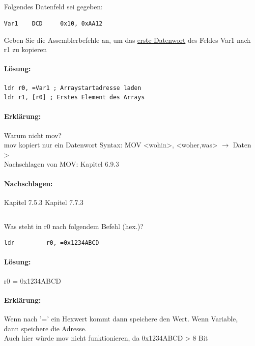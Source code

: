 \documentclass[12pt,twoside,a4paper]{article}
\begin{document}
\subsection{}
Folgendes Datenfeld sei gegeben:
\begin{lstlisting}
Var1 	DCD 	0x10, 0xAA12
\end{lstlisting}
Geben Sie die Assemblerbefehle an, um das \underline{erste Datenwort} des Feldes Var1 nach r1 zu kopieren

\paragraph*{Lösung:}
\begin{lstlisting}
ldr r0, =Var1 ; Arraystartadresse laden 
ldr r1, [r0] ; Erstes Element des Arrays
\end{lstlisting}
\paragraph*{Erklärung:}
Warum nicht mov?\\
mov kopiert nur ein Datenwort Syntax: MOV <wohin>, <woher,was> $\rightarrow$ Daten > \\
Nachschlagen von MOV: Kapitel 6.9.3\\
\paragraph*{Nachschlagen:}
Kapitel 7.5.3
Kapitel 7.7.3


\subsection{}
Was steht in r0 nach folgendem Befehl (hex.)?
\begin{lstlisting}
ldr 		r0, =0x1234ABCD
\end{lstlisting}


\paragraph*{Lösung:}
r0 = 0x1234ABCD

\paragraph*{Erklärung:} 
Wenn nach '=' ein Hexwert kommt dann speichere den Wert. Wenn Variable, dann speichere die Adresse.\\
Auch hier würde mov nicht funktionieren, da 0x1234ABCD > 8 Bit\\
\end{document}
